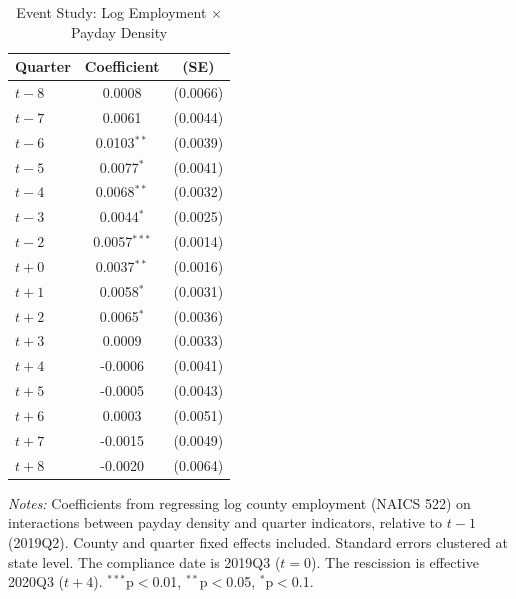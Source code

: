 \begin{table}[htbp]
\centering
\caption{Event Study: Log Employment $\times$ Payday Density}
\label{tab:eventstudy}
\begin{tabular}{lcc}
\toprule
Quarter & Coefficient & (SE) \\
\midrule
$t-8$ & 0.0008 & (0.0066) \\
$t-7$ & 0.0061 & (0.0044) \\
$t-6$ & 0.0103$^{**}$ & (0.0039) \\
$t-5$ & 0.0077$^{*}$ & (0.0041) \\
$t-4$ & 0.0068$^{**}$ & (0.0032) \\
$t-3$ & 0.0044$^{*}$ & (0.0025) \\
$t-2$ & 0.0057$^{***}$ & (0.0014) \\
$t+0$ & 0.0037$^{**}$ & (0.0016) \\
$t+1$ & 0.0058$^{*}$ & (0.0031) \\
$t+2$ & 0.0065$^{*}$ & (0.0036) \\
$t+3$ & 0.0009 & (0.0033) \\
$t+4$ & -0.0006 & (0.0041) \\
$t+5$ & -0.0005 & (0.0043) \\
$t+6$ & 0.0003 & (0.0051) \\
$t+7$ & -0.0015 & (0.0049) \\
$t+8$ & -0.0020 & (0.0064) \\
\bottomrule
\end{tabular}
\begin{tablenotes}[flushleft]\small
\item \textit{Notes:} Coefficients from regressing log county employment (NAICS 522) on interactions between payday density and quarter indicators, relative to $t-1$ (2019Q2). County and quarter fixed effects included. Standard errors clustered at state level. The compliance date is 2019Q3 ($t=0$). The rescission is effective 2020Q3 ($t+4$). $^{***}$p$<$0.01, $^{**}$p$<$0.05, $^{*}$p$<$0.1.
\end{tablenotes}
\end{table}

